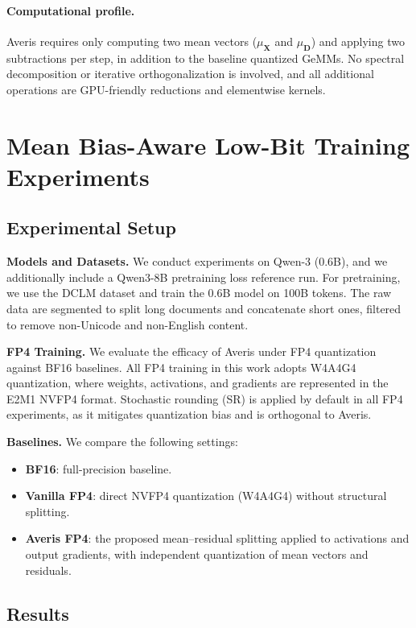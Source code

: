 \paragraph{Computational profile.}
Averis requires only computing two mean vectors ($\mu_{\mathbf{X}}$ and $\mu_{\mathbf{D}}$) and applying
two subtractions per step, in addition to the baseline quantized GeMMs.
No spectral decomposition or iterative orthogonalization is involved, and all additional operations are
GPU-friendly reductions and elementwise kernels.

\section{Mean Bias-Aware Low-Bit Training Experiments}
\label{sec:lowbit_experiment}

\subsection{Experimental Setup}

\label{experiment:setup}
\textbf{Models and Datasets.}
We conduct experiments on Qwen-3 (0.6B), and we additionally include a Qwen3-8B pretraining loss reference run.
For pretraining, we use the DCLM dataset and train the 0.6B model on 100B tokens.
The raw data are segmented to split long documents and concatenate short ones, filtered to remove non-Unicode and non-English content.

\textbf{FP4 Training.}
We evaluate the efficacy of Averis under FP4 quantization against BF16 baselines.
All FP4 training in this work adopts W4A4G4 quantization, where weights, activations, and gradients are represented in the E2M1 NVFP4 format.
Stochastic rounding (SR) is applied by default in all FP4 experiments, as it mitigates quantization bias and is orthogonal to Averis.

\textbf{Baselines.}
We compare the following settings:
\begin{itemize}[leftmargin=*,itemsep=2pt]
\item \textbf{BF16}: full-precision baseline.
\item \textbf{Vanilla FP4}: direct NVFP4 quantization (W4A4G4) without structural splitting.
\item \textbf{Averis FP4}: the proposed mean--residual splitting applied to activations and output gradients, with independent quantization of mean vectors and residuals.
\end{itemize}

\subsection{Results}

